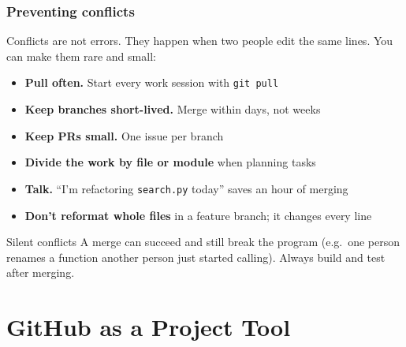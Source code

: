 \documentclass[aspectratio=169,10pt,compress]{beamer}
\newcommand{\cmd}[1]{\texttt{\color{gitred}#1}}
\begin{document}
\begin{frame}[t,fragile] \frametitle{Preventing conflicts}
  Conflicts are not errors. They happen when two people edit the same lines.
  You can make them rare and small:

  \vspace{0.5em}
  \begin{itemize}
    \item \textbf{Pull often.} Start every work session with \cmd{git pull}
    \item \textbf{Keep branches short-lived.} Merge within days, not weeks
    \item \textbf{Keep PRs small.} One issue per branch
    \item \textbf{Divide the work by file or module} when planning tasks
    \item \textbf{Talk.} ``I'm refactoring \texttt{search.py} today'' saves an hour of merging
    \item \textbf{Don't reformat whole files} in a feature branch; it changes every line
  \end{itemize}

  \vspace{0.5em}
  \begin{alertblock}{Silent conflicts}
    A merge can succeed and still break the program (e.g.\ one person renames a function
    another person just started calling). Always build and test after merging.
  \end{alertblock}
\end{frame}

\section[GitHub]{GitHub as a Project Tool}
\end{document}

